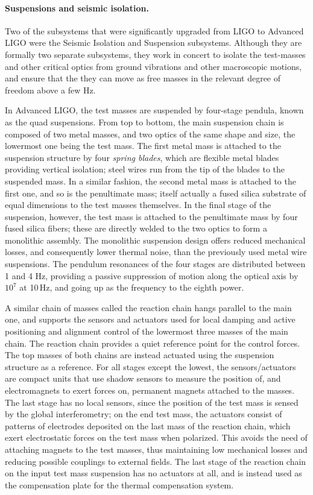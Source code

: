 \paragraph*{Suspensions and seismic isolation.}
Two of the subsystems that were significantly upgraded from LIGO to Advanced LIGO
were the Seismic Isolation\cite{SEI2015} and Suspension subsystems. Although they 
are formally two separate subsystems, they work in concert to isolate the test-masses and 
other critical optics from ground vibrations and other macroscopic motions, and ensure 
that the they can move as free masses in the relevant degree of freedom above a few Hz.

In Advanced LIGO, the test masses are suspended by four-stage pendula, known as the quad suspensions\cite{Aston_2012}. 
From top to bottom, the main suspension chain is composed of two metal masses, and two optics 
of the same shape and size, the lowermost one being the test mass.
The first metal mass is attached to the suspension structure by four \textit{spring blades}, which are flexible 
metal blades providing vertical isolation; steel wires run from the tip of the blades to the 
suspended mass.
In a similar fashion, the second metal mass is attached to the first one, 
and so is the penultimate mass; itself actually a fused silica substrate of equal dimensions to the test masses themselves. 
In the final stage of the suspension, however, the test mass 
is attached to the penultimate mass by four fused silica fibers; these are directly welded to 
the two optics to form a monolithic assembly.
The monolithic suspension design offers reduced mechanical losses, and
consequently lower thermal noise, than the previously used metal wire suspensions.
The pendulum resonances of the four stages are 
distributed between 1 and 4 Hz, providing a passive suppression of motion along 
the optical axis by $10^7$ at 10\,Hz, and going up as the frequency to the eighth power.

A similar chain of masses called the reaction chain hangs parallel to the main one, 
and supports the sensors and actuators used for local damping and active positioning and alignment control 
of the lowermost three masses of the main chain. The reaction chain provides a quiet reference point 
for the control forces.
The top masses of both chains are instead actuated using the suspension structure as a reference.
For all stages except the lowest, the sensors/actuators are compact units that use shadow sensors to measure the position of, and electromagnets to exert forces on, permanent magnets attached to the masses.
The last stage has no local sensors, since the position of the test mass is sensed 
by the global interferometry; on the end test mass, the actuators consist of patterns of electrodes 
deposited on the last mass of the reaction chain, which exert electrostatic forces on the test mass when polarized.
This avoids the need of attaching magnets to the test masses, thus maintaining low mechanical 
losses and reducing possible couplings to external fields.
The last stage of the reaction chain on the input test mass suspension has no actuators at all, and is instead used as the compensation plate for the thermal compensation system.

